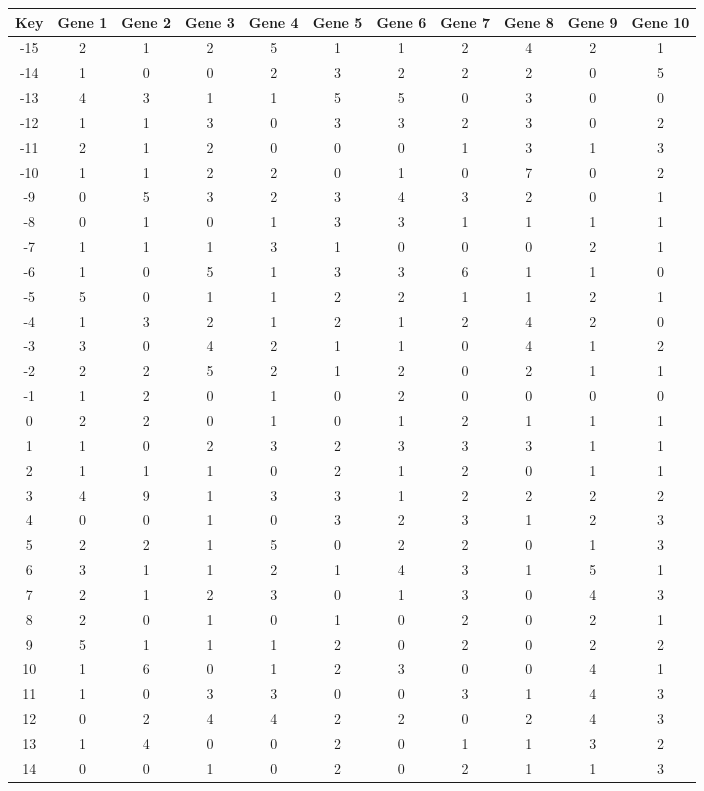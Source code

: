 \begin{tabular}{|c|c|c|c|c|c|c|c|c|c|c|}
\hline
Key & Gene 1 & Gene 2 & Gene 3 & Gene 4 & Gene 5 & Gene 6 & Gene 7 & Gene 8 & Gene 9 & Gene 10 \\
\hline
-15 & 2 & 1 & 2 & 5 & 1 & 1 & 2 & 4 & 2 & 1 \\
-14 & 1 & 0 & 0 & 2 & 3 & 2 & 2 & 2 & 0 & 5 \\
-13 & 4 & 3 & 1 & 1 & 5 & 5 & 0 & 3 & 0 & 0 \\
-12 & 1 & 1 & 3 & 0 & 3 & 3 & 2 & 3 & 0 & 2 \\
-11 & 2 & 1 & 2 & 0 & 0 & 0 & 1 & 3 & 1 & 3 \\
-10 & 1 & 1 & 2 & 2 & 0 & 1 & 0 & 7 & 0 & 2 \\
-9 & 0 & 5 & 3 & 2 & 3 & 4 & 3 & 2 & 0 & 1 \\
-8 & 0 & 1 & 0 & 1 & 3 & 3 & 1 & 1 & 1 & 1 \\
-7 & 1 & 1 & 1 & 3 & 1 & 0 & 0 & 0 & 2 & 1 \\
-6 & 1 & 0 & 5 & 1 & 3 & 3 & 6 & 1 & 1 & 0 \\
-5 & 5 & 0 & 1 & 1 & 2 & 2 & 1 & 1 & 2 & 1 \\
-4 & 1 & 3 & 2 & 1 & 2 & 1 & 2 & 4 & 2 & 0 \\
-3 & 3 & 0 & 4 & 2 & 1 & 1 & 0 & 4 & 1 & 2 \\
-2 & 2 & 2 & 5 & 2 & 1 & 2 & 0 & 2 & 1 & 1 \\
-1 & 1 & 2 & 0 & 1 & 0 & 2 & 0 & 0 & 0 & 0 \\
0 & 2 & 2 & 0 & 1 & 0 & 1 & 2 & 1 & 1 & 1 \\
1 & 1 & 0 & 2 & 3 & 2 & 3 & 3 & 3 & 1 & 1 \\
2 & 1 & 1 & 1 & 0 & 2 & 1 & 2 & 0 & 1 & 1 \\
3 & 4 & 9 & 1 & 3 & 3 & 1 & 2 & 2 & 2 & 2 \\
4 & 0 & 0 & 1 & 0 & 3 & 2 & 3 & 1 & 2 & 3 \\
5 & 2 & 2 & 1 & 5 & 0 & 2 & 2 & 0 & 1 & 3 \\
6 & 3 & 1 & 1 & 2 & 1 & 4 & 3 & 1 & 5 & 1 \\
7 & 2 & 1 & 2 & 3 & 0 & 1 & 3 & 0 & 4 & 3 \\
8 & 2 & 0 & 1 & 0 & 1 & 0 & 2 & 0 & 2 & 1 \\
9 & 5 & 1 & 1 & 1 & 2 & 0 & 2 & 0 & 2 & 2 \\
10 & 1 & 6 & 0 & 1 & 2 & 3 & 0 & 0 & 4 & 1 \\
11 & 1 & 0 & 3 & 3 & 0 & 0 & 3 & 1 & 4 & 3 \\
12 & 0 & 2 & 4 & 4 & 2 & 2 & 0 & 2 & 4 & 3 \\
13 & 1 & 4 & 0 & 0 & 2 & 0 & 1 & 1 & 3 & 2 \\
14 & 0 & 0 & 1 & 0 & 2 & 0 & 2 & 1 & 1 & 3 \\
\hline
\end{tabular}
